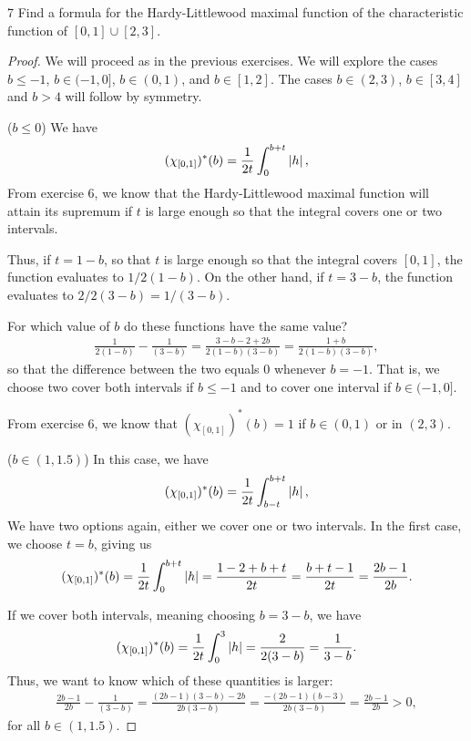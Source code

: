 \begin{exercise}{7}
Find a formula for the Hardy-Littlewood maximal function of the characteristic function of $[0,1] \cup [2,3]$.
\end{exercise}
\begin{proof}
We will proceed as in the previous exercises.
We will explore the cases $b \leq -1$, $b \in (-1, 0]$, $b \in (0, 1)$, and $b \in [1,2]$. 
The cases $b \in (2, 3)$, $b \in [3, 4]$ and $b > 4$ will follow by symmetry.

($b \leq 0$)
We have
\begin{align*}
    (\chi_{[0,1]})^\ast(b)
    = \frac{1}{2t} \int_{0}^{b+t} \left\lvert h\right\rvert,
\end{align*}
From exercise 6, we know that the Hardy-Littlewood maximal function will attain its supremum if $t$ is large enough so that the integral covers one or two intervals.

Thus, if $t = 1 - b$, so that $t$ is large enough so that the integral covers $[0,1]$, the function evaluates to $1/2(1-b)$.
On the other hand, if $t = 3 - b$, the function evaluates to $2/2(3-b) = 1/(3-b)$.

For which value of $b$ do these functions have the same value?
\begin{align*}
    \frac{1}{2(1-b)} - \frac{1}{(3-b)}
    = \frac{3 - b - 2 + 2b}{2(1-b)(3-b)}
    = \frac{1 + b}{2(1-b)(3-b)},
\end{align*}
so that the difference between the two equals 0 whenever $b = -1$. 
That is, we choose two cover both intervals if $b \leq -1$ and to cover one interval if $b \in (-1, 0]$.

From exercise 6, we know that $(\chi_{[0,1]})^\ast(b) = 1$ if $b \in (0,1)$ or in $(2,3)$.

($b \in (1, 1.5)$)
In this case, we have
\begin{align*}
    (\chi_{[0,1]})^\ast(b)
    = \frac{1}{2t} \int_{b-t}^{b+t} \left\lvert h\right\rvert,
\end{align*}
We have two options again, either we cover one or two intervals.
In the first case, we choose $t = b$, giving us
\begin{align*}
    (\chi_{[0,1]})^\ast(b)
    = \frac{1}{2t} \int_{0}^{b+t} \left\lvert h\right\rvert
    = \frac{1 - 2 + b + t}{2t}
    = \frac{b + t - 1}{2t}
    = \frac{2b - 1}{2b}.
\end{align*}

If we cover both intervals, meaning choosing $b = 3 - b$, we have
\begin{align*}
    (\chi_{[0,1]})^\ast(b)
    = \frac{1}{2t} \int_{0}^{3} \left\lvert h\right\rvert
    = \frac{2}{2(3-b)}
    = \frac{1}{3-b}.
\end{align*}
Thus, we want to know which of these quantities is larger:
\begin{align*}
    \frac{2b - 1}{2b} - \frac{1}{(3-b)}
    = \frac{(2b - 1)(3-b) - 2b}{2b(3-b)}
    = \frac{-(2b - 1)(b - 3)}{2b(3-b)}
    = \frac{2b - 1}{2b} 
    > 0,
\end{align*}
for all $b \in (1, 1.5)$.


\end{proof}
